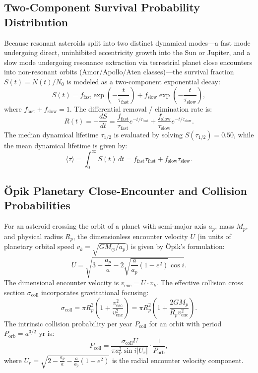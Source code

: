 \documentclass[11pt,a4paper]{article}
\begin{document}
\subsection{Two-Component Survival Probability Distribution}
Because resonant asteroids split into two distinct dynamical modes---a fast mode undergoing direct, uninhibited eccentricity growth into the Sun or Jupiter, and a slow mode undergoing resonance extraction via terrestrial planet close encounters into non-resonant orbits (Amor/Apollo/Aten classes)---the survival fraction $S(t) = N(t)/N_0$ is modeled as a two-component exponential decay:
\begin{equation}
S(t) = f_{\text{fast}} \exp\left( -\frac{t}{\tau_{\text{fast}}} \right) + f_{\text{slow}} \exp\left( -\frac{t}{\tau_{\text{slow}}} \right),
\label{eq:surv}
\end{equation}
where $f_{\text{fast}} + f_{\text{slow}} = 1$. The differential removal / elimination rate is:
\begin{equation}
R(t) = -\frac{dS}{dt} = \frac{f_{\text{fast}}}{\tau_{\text{fast}}} e^{-t/\tau_{\text{fast}}} + \frac{f_{\text{slow}}}{\tau_{\text{slow}}} e^{-t/\tau_{\text{slow}}}.
\end{equation}
The median dynamical lifetime $\tau_{1/2}$ is evaluated by solving $S(\tau_{1/2}) = 0.50$, while the mean dynamical lifetime is given by:
\begin{equation}
\langle \tau \rangle = \int_0^\infty S(t)\,dt = f_{\text{fast}} \tau_{\text{fast}} + f_{\text{slow}} \tau_{\text{slow}}.
\end{equation}

\subsection{Öpik Planetary Close-Encounter and Collision Probabilities}
For an asteroid crossing the orbit of a planet with semi-major axis $a_p$, mass $M_p$, and physical radius $R_p$, the dimensionless encounter velocity $U$ (in units of planetary orbital speed $v_k = \sqrt{G M_\odot / a_p}$) is given by Öpik's formulation:
\begin{equation}
U = \sqrt{3 - \frac{a_p}{a} - 2 \sqrt{\frac{a}{a_p}(1 - e^2)} \cos i}.
\end{equation}
The dimensional encounter velocity is $v_{\text{enc}} = U \cdot v_k$. The effective collision cross section $\sigma_{\text{coll}}$ incorporates gravitational focusing:
\begin{equation}
\sigma_{\text{coll}} = \pi R_p^2 \left( 1 + \frac{v_{\text{esc}}^2}{v_{\text{enc}}^2} \right) = \pi R_p^2 \left( 1 + \frac{2 G M_p}{R_p v_{\text{enc}}^2} \right).
\end{equation}
The intrinsic collision probability per year $P_{\text{coll}}$ for an orbit with period $P_{\text{orb}} = a^{3/2}\text{ yr}$ is:
\begin{equation}
P_{\text{coll}} = \frac{\sigma_{\text{coll}} U}{\pi a_p^2 \sin i |U_r|} \cdot \frac{1}{P_{\text{orb}}},
\end{equation}
where $U_r = \sqrt{2 - \frac{a_p}{a} - \frac{a}{a_p}(1 - e^2)}$ is the radial encounter velocity component.
\end{document}
